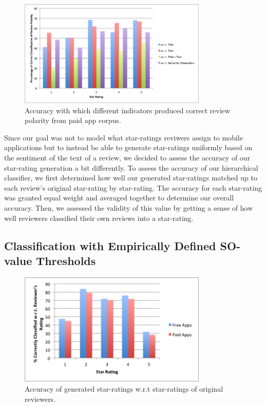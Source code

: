 \documentclass[11pt]{report} %
\begin{document}
	\begin{figure}[H]
	\centering
	\includegraphics[width=0.8\textwidth]{data/pmi-cue-paid-pol-acc.png}
	\caption{Accuracy with which different indicators produced correct review polarity from paid app corpus.}
	\label{fig:pmi-cue-paid-pol-acc}
	\end{figure}

Since our goal was not to model what star-ratings reviwers assign to mobile applications but to instead be able to generate star-ratings uniformly based on the sentiment of the text of a review, we decided to assess the accuracy of our star-rating generation a bit differently. To assess the accuracy of our hierarchical classifier, we first determined how well our generated star-ratings matched up to each review's original star-rating by star-rating. The accuracy for each star-rating was granted equal weight and averaged together to determine our overall accuracy. Then, we assessed the validity of this value by getting a sense of how well reviewers classified their own reviews into a star-rating.

\subsection{Classification with Empirically Defined SO-value Thresholds}
\label{subsection:empirically_defined_so}
\begin{figure}[H]
	\centering
	\includegraphics[width=0.8\textwidth]{data/pmi-cue-accuracy.png}
	\caption{Accuracy of generated star-ratings w.r.t star-ratings of original reviewers.}
	\label{fig:pmi-cue-acc}
	\end{figure}
\end{document}
